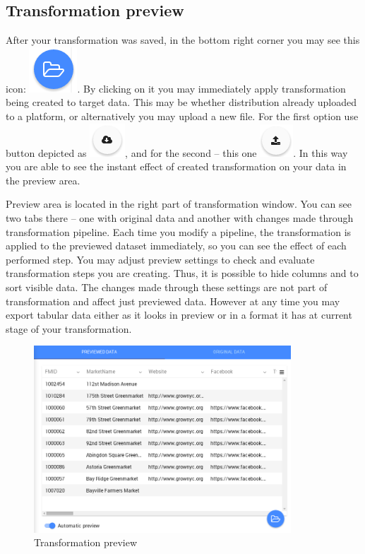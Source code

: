 \documentclass[USenglish]{article}
\begin{document}
\subsection{Transformation preview}

After your transformation was saved, in the bottom right corner you may see this icon: {\includegraphics[scale=0.3]{open.png}}. By clicking on it you may immediately apply transformation being created to target data. This may be whether distribution already uploaded to a platform, or alternatively you may upload a new file. For the first option use button depicted as  {\includegraphics[scale=0.3]{applytoexisting.png}}, and for the second -- this one {\includegraphics[scale=0.3]{uploadnew.png}}. In this way you are able to see the instant effect of created transformation on your data in the preview area. 

Preview area is located in the right part of transformation window. You can see two tabs there -- one with original data and another with changes made through transformation pipeline. Each time you modify a pipeline, the transformation is  applied to the previewed dataset immediately, so you can see the effect of each performed step. You may adjust preview settings to check and evaluate transformation steps you are creating. Thus, it is possible to hide columns and to sort visible data. The changes made through these settings are not part of transformation and affect just previewed data. However at any time you may export tabular data either as it looks in preview or in a format it has at current stage of your transformation. 

\begin{center}
\begin{figure}[!htbp]
\centering
\includegraphics[height=7cm] {preview.png}
 \caption{Transformation preview \label{meta}}
\end{figure}
\end{center}
\end{document}
